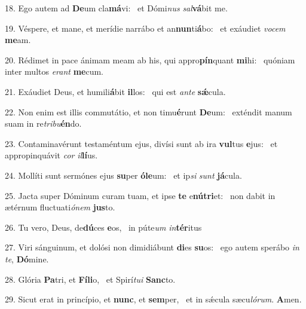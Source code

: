 18. Ego autem ad \textbf{De}um cla\textbf{má}vi: \ast\  et Dómi\textit{nus} \textit{sal}\textbf{vá}bit me.\

19. Véspere, et mane, et merídie narrábo et an\textbf{nun}ti\textbf{á}bo: \ast\  et exáudiet \textit{vo}\textit{cem} \textbf{me}am.\

20. Rédimet in pace ánimam meam ab his, qui appro\textbf{pín}quant \textbf{mi}hi: \ast\  quóniam inter multos \textit{e}\textit{rant} \textbf{me}cum.\

21. Exáudiet Deus, et humili\textbf{á}bit \textbf{il}los: \ast\  qui est \textit{an}\textit{te} \textbf{sǽ}cula.\

22. Non enim est illis commutátio, et non timu\textbf{é}runt \textbf{De}um: \ast\  exténdit manum suam in re\textit{tri}\textit{bu}\textbf{én}do.\

23. Contaminavérunt testaméntum ejus, divísi sunt ab ira \textbf{vul}tus \textbf{e}jus: \ast\  et appropinquávit \textit{cor} \textit{il}\textbf{lí}us.\

24. Mollíti sunt sermónes ejus \textbf{su}per \textbf{ó}\textbf{le}um: \ast\  et ip\textit{si} \textit{sunt} \textbf{já}cula.\

25. Jacta super Dóminum curam tuam, et ipse \textbf{te} e\textbf{nú}\textbf{tri}et: \ast\  non dabit in ætérnum fluctuati\textit{ó}\textit{nem} \textbf{jus}to.\

26. Tu vero, Deus, de\textbf{dú}ces \textbf{e}os, \ast\  in púte\textit{um} \textit{in}\textbf{tér}itus\

27. Viri sánguinum, et dolósi non dimidiábunt \textbf{di}es \textbf{su}os: \ast\  ego autem sperábo \textit{in} \textit{te}, \textbf{Dó}mine.\

28. Glória \textbf{Pa}tri, et \textbf{Fí}\textbf{li}o, \ast\  et Spirí\textit{tu}\textit{i} \textbf{Sanc}to.\

29. Sicut erat in princípio, et \textbf{nunc}, et \textbf{sem}per, \ast\  et in sǽcula sæcu\textit{ló}\textit{rum}. \textbf{A}men.\

